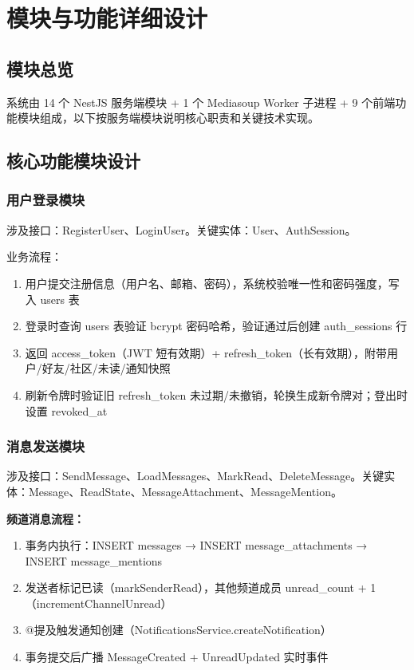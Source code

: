 \section{模块与功能详细设计}

\subsection{模块总览}

系统由 14 个 NestJS 服务端模块 + 1 个 Mediasoup Worker 子进程 + 9 个前端功能模块组成，以下按服务端模块说明核心职责和关键技术实现。

\subsection{核心功能模块设计}

\subsubsection{用户登录模块}

涉及接口：RegisterUser、LoginUser。关键实体：User、AuthSession。

业务流程：
\begin{enumerate}[itemsep=0pt]
  \item 用户提交注册信息（用户名、邮箱、密码），系统校验唯一性和密码强度，写入 users 表
  \item 登录时查询 users 表验证 bcrypt 密码哈希，验证通过后创建 auth\_sessions 行
  \item 返回 access\_token（JWT 短有效期）+ refresh\_token（长有效期），附带用户/好友/社区/未读/通知快照
  \item 刷新令牌时验证旧 refresh\_token 未过期/未撤销，轮换生成新令牌对；登出时设置 revoked\_at
\end{enumerate}

\subsubsection{消息发送模块}

涉及接口：SendMessage、LoadMessages、MarkRead、DeleteMessage。关键实体：Message、ReadState、MessageAttachment、MessageMention。

\textbf{频道消息流程：}
\begin{enumerate}[itemsep=0pt]
  \item 事务内执行：INSERT messages → INSERT message\_attachments → INSERT message\_mentions
  \item 发送者标记已读（markSenderRead），其他频道成员 unread\_count + 1（incrementChannelUnread）
  \item @提及触发通知创建（NotificationsService.createNotification）
  \item 事务提交后广播 MessageCreated + UnreadUpdated 实时事件
\end{enumerate}

